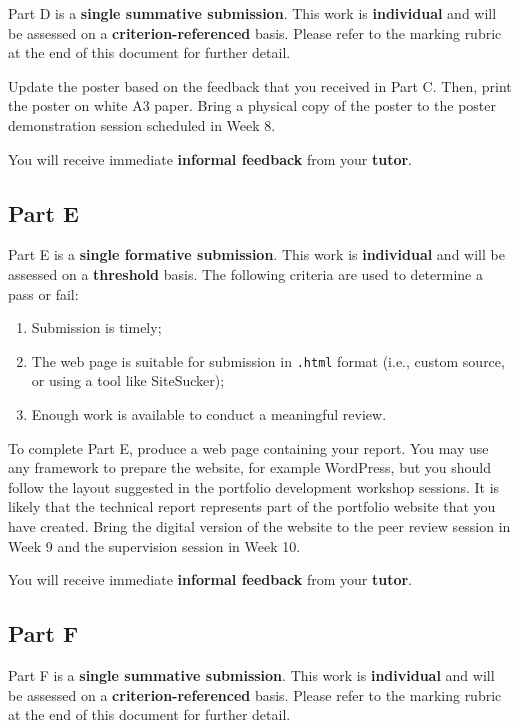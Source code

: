 \documentclass{../../fal_assignment}
\begin{document}
Part D is a \textbf{single summative submission}. This work is \textbf{individual} and will be assessed on a \textbf{criterion-referenced} basis.  Please refer to the marking rubric at the end of this document for further detail.

Update the poster based on the feedback that you received in Part C. Then, print the poster on white A3 paper. Bring a physical copy of the poster to the poster demonstration session scheduled in Week 8.

You will receive immediate \textbf{informal feedback} from your \textbf{tutor}.

\subsection*{Part E}

Part E is a \textbf{single formative submission}. This work is \textbf{individual} and will be assessed on a \textbf{threshold} basis.  The following criteria are used to determine a pass or fail:

\begin{enumerate}[label=(\alph*)]
	\item Submission is timely;
	\item The web page is suitable for submission in \texttt{.html} format (i.e., custom source, or using a tool like SiteSucker);
	\item Enough work is available to conduct a meaningful review.
\end{enumerate}

To complete Part E, produce a web page containing your report. You may use any framework to prepare the website, for example WordPress, but you should follow the layout suggested in the portfolio development workshop sessions. It is likely that the technical report represents part of the portfolio website that you have created.  Bring the digital version of the website to the peer review session in Week 9 and the supervision session in Week 10.

You will receive immediate \textbf{informal feedback} from your \textbf{tutor}.

\subsection*{Part F}

Part F is a \textbf{single summative submission}. This work is \textbf{individual} and will be assessed on a \textbf{criterion-referenced} basis.  Please refer to the marking rubric at the end of this document for further detail.
\end{document}
